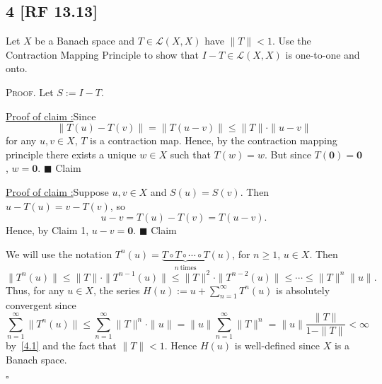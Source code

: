 \documentclass[12pt]{article}
\newcounter{ProofCounter}
\newcounter{ClaimCounter}[ProofCounter]
\newenvironment{Proof}{\stepcounter{ProofCounter}\textsc{Proof.}}{\hfill$\square$}
\newenvironment{claim}[1]{\vspace{1mm}\stepcounter{ClaimCounter}\par\noindent\underline{\bf Claim \theClaimCounter:}\space#1}{}
\newenvironment{claimproof}[1]{\par\noindent\underline{Proof of claim \theClaimCounter:}\space#1}{\hfill $\blacksquare$ Claim \theClaimCounter}
\begin{document}
\subsection*{4 [RF 13.13]}
\begin{tcolorbox}
  Let $X$ be a Banach space and $T \in \mathcal{L}(X,X)$ have $\|T\| < 1$. Use the Contraction Mapping Principle to show that $I - T \in
  \mathcal{L}(X,X)$ is one-to-one and onto.
\end{tcolorbox}
\begin{Proof}
  Let $S := I - T$. 
  \begin{claimproof}
    Since 
    \[ \|T(u) - T(v)\| = \|T(u-v)\| \leq \|T\|\cdot \|u - v\| \]
    for any $u, v \in X$, $T$ is a contraction map. Hence, by the contraction mapping principle there exists a unique $w \in X$ such that $T(w) = w$.
    But since $T(\bm{0}) = \bm{0}$, $w = \bm{0}$.
  \end{claimproof}

  \begin{claimproof}
    Suppose $u,v \in X$ and $S(u) = S(v)$. Then $u - T(u) = v - T(v)$, so 
    \[
      u-v = T(u) - T(v) = T(u-v). 
    \]
    Hence, by Claim 1, $u - v = \bm{0}$.
  \end{claimproof}

  We will use the notation $T^{n}(u) = \underbrace{T\circ T\circ \cdots \circ T}_{n\ \text{times}}(u)$, for $n \geq 1$, $u \in X$. Then
  \begin{equation}
    \|T^{n}(u)\| \leq \|T\|\cdot \|T^{n-1}(u)\| \leq \|T\|^{2}\cdot \|T^{n-2}(u)\| \leq \cdots \leq \|T\|^{n}\|u\|.
    \label{4.1}
  \end{equation}
  Thus, for any $u \in X$, the series 
  $H(u) := u + \sum_{n=1}^{\infty}T^{n}(u)$
  is absolutely convergent since 
  \[
    \sum_{n=1}^{\infty}\|T^{n}(u)\| \leq \sum_{n=1}^{\infty}\|T\|^{n}\cdot \|u\| = \|u\| \sum_{n=1}^{\infty}\|T\|^{n} = \|u\|\frac{\|T\|}{1 - \|T\|} <
    \infty
  \]
  by~\eqref{4.1} and the fact that $\|T\| < 1$. Hence $H(u)$ is well-defined since $X$ is a Banach space.


\end{Proof}
\end{document}
